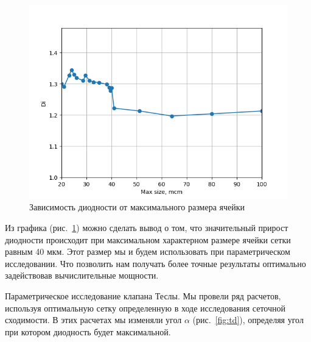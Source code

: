 \documentclass[14pt,a4paper]{article}
\begin{document}
                            
         
         \begin{figure}[H]
             \centering
             \includegraphics[width = 1\linewidth]{graphDiMaxSize}
             \caption{Зависимость диодности от максимального размера ячейки}
             \label{fig:graphDiMaxSize}
         \end{figure}
         
         Из графика (рис.~\ref{fig:graphDiMaxSize}) можно сделать вывод о том, что значительный прирост диодности происходит при максимальном характерном размере ячейки сетки равным 40 мкм. Этот размер мы и будем использовать при параметрическом исследовании. Что позволить нам получать более точные результаты оптимально задействовав вычислительные мощности. 
         
         
         Параметрическое исследование клапана Теслы. Мы провели ряд расчетов, используя оптимальную сетку определенную в ходе исследования сеточной сходимости. В этих расчетах мы изменяли угол $ \alpha $ (рис.~\ref{fig:td}), определяя угол при котором диодность будет максимальной.
         
\end{document}
